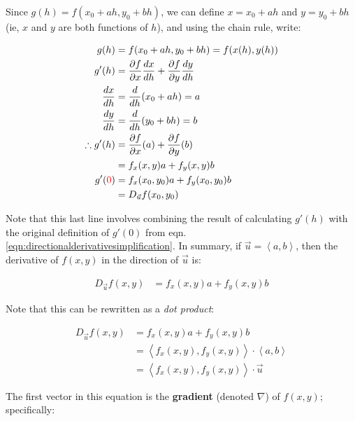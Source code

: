 \documentclass[12pt]{article}
\begin{document}
Since $g(h) = f(x_0+ah,y_0+bh)$, we can define $x = x_0+ah$ and $y = y_0+bh$ (ie, $x$ and $y$ are both functions of $h$), and using the chain rule, write:

\begin{equation}\label{eqn:directionalderivativesimplification}
    \begin{split}
        g(h) &= f(x_0+ah,y_0+bh) = f(x(h),y(h))\\
        g'(h) &= \frac{\partial f}{\partial x}\frac{dx}{dh} + \frac{\partial f}{\partial y}\frac{dy}{dh}\\
        \frac{dx}{dh} &= \frac{d}{dh} (x_0+ah) = a\\
        \frac{dy}{dh} &= \frac{d}{dh} (y_0+bh) = b\\
        \therefore g'(h) &= \frac{\partial f}{\partial x}(a) + \frac{\partial f}{\partial y}(b)\\
        &= f_x(x,y)a + f_y(x,y)b\\
        g'(\textcolor{red}{0}) &= f_x(x_0,y_0)a + f_y(x_0,y_0)b\\
        &= D_{\vec{u}}f(x_0,y_0)
    \end{split}
\end{equation}

Note that this last line involves combining the result of calculating $g'(h)$ with the original definition of $g'(0)$ from eqn. \ref{eqn:directionalderivativesimplification}. In summary, if $\vec{u} = \left\langle a, b \right\rangle$, then the derivative of $f(x,y)$ in the direction of $\vec{u}$ is:

\begin{equation}
    \begin{split}
        D_{\vec{u}}f(x,y) &= f_x(x,y)a + f_y(x,y)b
    \end{split}
\end{equation}

Note that this can be rewritten as a \textit{dot product}:

\begin{equation}
    \begin{split}
        D_{\vec{u}}f(x,y) &= f_x(x,y)a + f_y(x,y)b\\
        &= \left\langle f_x(x,y), f_y(x,y) \right\rangle \cdot \left\langle a, b \right\rangle\\
        &= \left\langle f_x(x,y), f_y(x,y) \right\rangle \cdot \vec{u}
    \end{split}
\end{equation}

The first vector in this equation is the \textbf{gradient} (denoted $\nabla$) of $f(x,y)$; specifically:
\end{document}
